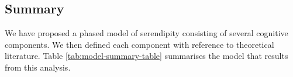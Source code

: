 



\subsection{Summary}
We have proposed a phased model of serendipity consisting of several
cognitive components.  We then defined each component with reference
to theoretical literature.  Table \ref{tab:model-summary-table}
summarises the model that results from this analysis.


